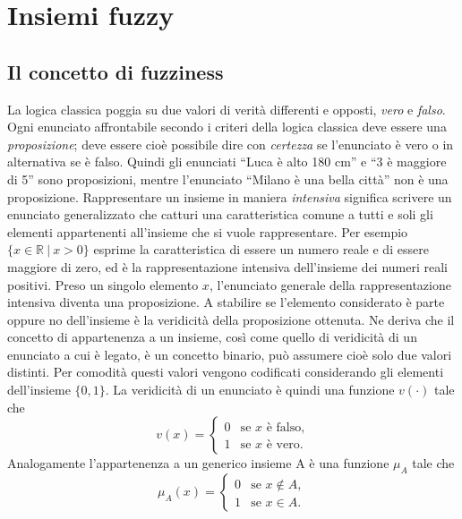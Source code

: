 \documentclass [11pt,a4paper,twoside,openright] {book}
\begin{document}
\chapter{Insiemi fuzzy}
\section{Il concetto di fuzziness}
La logica classica poggia su due valori di verità differenti e opposti, \textit{vero} e \textit{falso}. Ogni enunciato affrontabile secondo i criteri della logica classica deve essere una \textit{proposizione}; deve essere cioè possibile dire con \textit{certezza} se l'enunciato è vero o in alternativa se è falso. Quindi gli enunciati ``Luca è alto 180 cm'' e ``3 è maggiore di 5'' sono proposizioni, mentre l'enunciato ``Milano è una bella città'' non è una proposizione. Rappresentare un insieme in maniera \textit{intensiva} significa scrivere un enunciato generalizzato che catturi una caratteristica comune a tutti e soli gli elementi appartenenti all'insieme che si vuole rappresentare. Per esempio $\lbrace x \in \mathbb{R} \: | \: x>0 \rbrace$ esprime la caratteristica di essere un numero reale e di essere maggiore di zero, ed è la rappresentazione intensiva dell'insieme dei numeri reali positivi. Preso un singolo elemento $x$, l'enunciato generale della rappresentazione intensiva diventa una proposizione. A stabilire se l'elemento considerato è parte oppure no dell'insieme è la veridicità della proposizione ottenuta. Ne deriva che il concetto di appartenenza a un insieme, così come quello di veridicità di un enunciato a cui è legato, è un concetto binario, può assumere cioè solo due valori distinti. Per comodità questi valori vengono codificati considerando gli elementi dell'insieme $\lbrace 0, 1 \rbrace$. La veridicità di un enunciato è quindi una funzione $v(\cdot)$ tale che
\begin{equation}
v(x)=
\begin{cases}
0 & \text{se } x \text{ è falso,} \\
1 & \text{se } x \text{ è vero.}
\end{cases}
\end{equation}
Analogamente l'appartenenza a un generico insieme A è una funzione $\mu_{A}$ tale che
\begin{equation}
\mu_{A}(x)=
\begin{cases}
0 & \text{se } x \notin A ,\\
1 & \text{se } x \in A.
\end{cases}
\end{equation}
\end{document}
